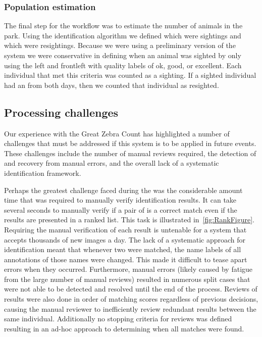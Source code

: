         \subsubsection{Population estimation}
            The final step for the \GZC{} workflow was to estimate the number of animals in the park.  Using the
            identification algorithm we defined which \annots{} were sightings and which were resightings. Because we
            were using a preliminary version of the system we were conservative in defining when an animal was sighted
            by only using the left and frontleft \annots{} with quality labels of ok, good, or excellent.  Each
            individual that met this criteria was counted as a sighting.  If a sighted individual had an \annot{} from
            both days, then we counted that individual as resighted.

    \subsection{Processing challenges}
        Our experience with the Great Zebra Count has highlighted a number of challenges that must be addressed if this
        system is to be applied in future events. These challenges include the number of manual reviews required, the
        detection of and recovery from manual errors, and the overall lack of a systematic identification framework.

        Perhaps the greatest challenge faced during the \GZC{} was the considerable amount time that was required to
        manually verify identification results. It can take several seconds to manually verify if a pair of \annots{} is
        a correct match even if the results are presented in a ranked list. This task is illustrated
        in~\cref{fig:RankFigure}. Requiring the manual verification of each result is untenable for a system that
        accepts thousands of new images a day. The lack of a systematic approach for identification meant that whenever
        two \annots{} were matched, the name labels of all annotations of those names were changed. This made it
        difficult to tease apart errors when they occurred. Furthermore, manual errors (likely caused by fatigue from
        the large number of manual reviews) resulted in numerous split cases that were not able to be detected and
        resolved until the end of the process. Reviews of results were also done in order of matching scores regardless
        of previous decisions, causing the manual reviewer to inefficiently review redundant results between the same
        individual. Additionally no stopping criteria for reviews was defined resulting in an ad-hoc approach to
        determining when all matches were found.

